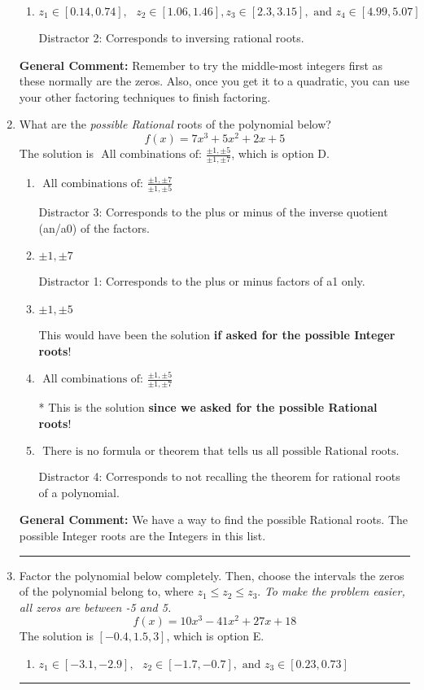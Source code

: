 \documentclass{extbook}[14pt]
\newcommand{\litem}[1]{\item #1

\rule{\textwidth}{0.4pt}}
\begin{document}
\begin{enumerate}
{\begin{enumerate}[label=\Alph*.]
* This is the solution!
\item \( z_1 \in [0.14, 0.74], \text{   }  z_2 \in [1.06, 1.46], z_3 \in [2.3, 3.15], \text{   and   } z_4 \in [4.99, 5.07] \)

 Distractor 2: Corresponds to inversing rational roots.
\end{enumerate}

\textbf{General Comment:} Remember to try the middle-most integers first as these normally are the zeros. Also, once you get it to a quadratic, you can use your other factoring techniques to finish factoring.
}
\litem{
What are the \textit{possible Rational} roots of the polynomial below?
\[ f(x) = 7x^{3} +5 x^{2} +2 x + 5 \]The solution is \( \text{ All combinations of: }\frac{\pm 1,\pm 5}{\pm 1,\pm 7} \), which is option D.\begin{enumerate}[label=\Alph*.]
\item \( \text{ All combinations of: }\frac{\pm 1,\pm 7}{\pm 1,\pm 5} \)

 Distractor 3: Corresponds to the plus or minus of the inverse quotient (an/a0) of the factors. 
\item \( \pm 1,\pm 7 \)

 Distractor 1: Corresponds to the plus or minus factors of a1 only.
\item \( \pm 1,\pm 5 \)

This would have been the solution \textbf{if asked for the possible Integer roots}!
\item \( \text{ All combinations of: }\frac{\pm 1,\pm 5}{\pm 1,\pm 7} \)

* This is the solution \textbf{since we asked for the possible Rational roots}!
\item \( \text{ There is no formula or theorem that tells us all possible Rational roots.} \)

 Distractor 4: Corresponds to not recalling the theorem for rational roots of a polynomial.
\end{enumerate}

\textbf{General Comment:} We have a way to find the possible Rational roots. The possible Integer roots are the Integers in this list.
}
\litem{
Factor the polynomial below completely. Then, choose the intervals the zeros of the polynomial belong to, where $z_1 \leq z_2 \leq z_3$. \textit{To make the problem easier, all zeros are between -5 and 5.}
\[ f(x) = 10x^{3} -41 x^{2} +27 x + 18 \]The solution is \( [-0.4, 1.5, 3] \), which is option E.\begin{enumerate}[label=\Alph*.]
\item \( z_1 \in [-3.1, -2.9], \text{   }  z_2 \in [-1.7, -0.7], \text{   and   } z_3 \in [0.23, 0.73] \)


\end{enumerate}}
\end{enumerate}
\end{document}
